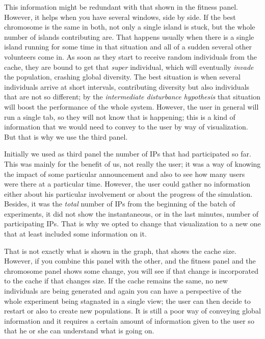\documentclass{sig-alternate}
\begin{document}
This information might be redundant with that shown in the fitness
panel. However, it helps when you
have several windows, side by side. If the best chromosome is the same
in both, not only a single island is stuck, but the whole number of
islands contributing are. That happens usually when there is a single
island running for some time in that situation and all of a sudden
several other volunteers come in. As soon as they start to receive
random individuals from the cache, they are bound to get that {\em
  super} individual, which will eventually {\em invade} the
population, crashing global diversity. The best situation is when
several individuals arrive at short intervals, contributing diversity
but also individuals that are not so different; by the {\em
  intermediate disturbance hypothesis} that
situation will boost the performance of the whole system. However, the
user in general will run a single tab, so they will not know that is
happening; this is a kind of information that we would need to convey
to the user by way of visualization. But that is why we use the third
panel. 

Initially we used as third panel the number of IPs that had
participated so far. %
This was
mainly for the benefit of us, not really the user; it was a way of
knowing the impact of some particular announcement and also to see how
many users were there at a particular time. However, the user could
gather no information either about his particular involvement or about
the progress of the simulation. Besides, it was the {\em total} number
of IPs from the beginning of the batch of experiments, it did not show
the instantaneous, or in the last minutes, number of participating
IPs. That is why we opted to change that visualization to a new one
that at least included some information on it. 

That is not exactly what is shown in the graph, that
shows the cache size. However, if you combine this panel with the
other, and the fitness panel and the chromosome panel shows some
change, you will see if that change is incorporated to the cache if
that changes size. If the cache remains the same, no new individuals
are being generated and again you can have a perspective of the whole
experiment being stagnated in a single view; the user can then decide
to restart or also to create new populations. It is still a poor way
of conveying global information and it requires a certain amount of
information given to the user so that he or she can understand what is
going on.
\end{document}
